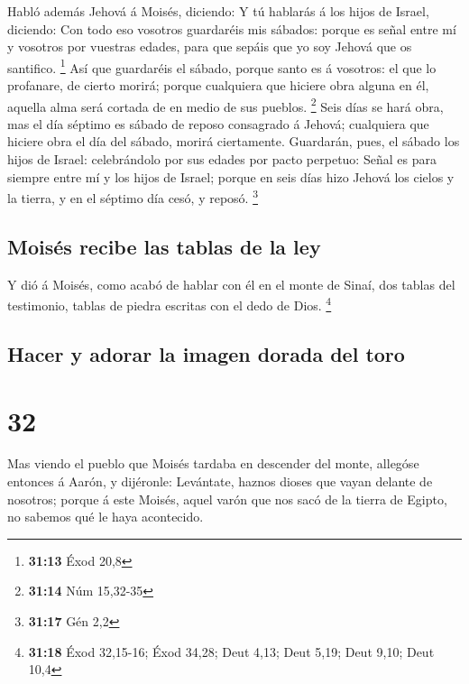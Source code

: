  Habló además Jehová á Moisés, diciendo:  Y tú
hablarás á los hijos de Israel, diciendo: Con todo eso vosotros
guardaréis mis sábados: porque es señal entre mí y vosotros por vuestras
edades, para que sepáis que yo soy Jehová que os santifico. \footnote{\textbf{31:13}
  Éxod 20,8}  Así que guardaréis el sábado, porque santo es
á vosotros: el que lo profanare, de cierto morirá; porque cualquiera que
hiciere obra alguna en él, aquella alma será cortada de en medio de sus
pueblos. \footnote{\textbf{31:14} Núm 15,32-35}  Seis días
se hará obra, mas el día séptimo es sábado de reposo consagrado á
Jehová; cualquiera que hiciere obra el día del sábado, morirá
ciertamente.  Guardarán, pues, el sábado los hijos de
Israel: celebrándolo por sus edades por pacto perpetuo: 
Señal es para siempre entre mí y los hijos de Israel; porque en seis
días hizo Jehová los cielos y la tierra, y en el séptimo día cesó, y
reposó. \footnote{\textbf{31:17} Gén 2,2}

\hypertarget{moisuxe9s-recibe-las-tablas-de-la-ley}{%
\subsection{Moisés recibe las tablas de la
ley}\label{moisuxe9s-recibe-las-tablas-de-la-ley}}

 Y dió á Moisés, como acabó de hablar con él en el monte de
Sinaí, dos tablas del testimonio, tablas de piedra escritas con el dedo
de Dios. \footnote{\textbf{31:18} Éxod 32,15-16; Éxod 34,28; Deut 4,13;
  Deut 5,19; Deut 9,10; Deut 10,4}

\hypertarget{hacer-y-adorar-la-imagen-dorada-del-toro}{%
\subsection{Hacer y adorar la imagen dorada del
toro}\label{hacer-y-adorar-la-imagen-dorada-del-toro}}

\hypertarget{section-31}{%
\section{32}\label{section-31}}

 Mas viendo el pueblo que Moisés tardaba en descender del
monte, allegóse entonces á Aarón, y dijéronle: Levántate, haznos dioses
que vayan delante de nosotros; porque á este Moisés, aquel varón que nos
sacó de la tierra de Egipto, no sabemos qué le haya acontecido.


